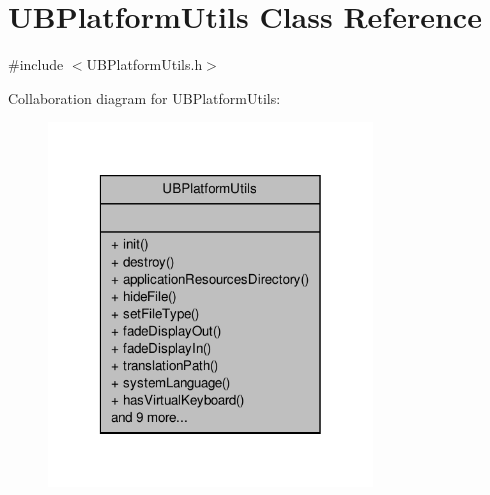 \hypertarget{class_u_b_platform_utils}{\section{U\-B\-Platform\-Utils Class Reference}
\label{d4/d99/class_u_b_platform_utils}
}


{\ttfamily \#include $<$U\-B\-Platform\-Utils.\-h$>$}



Collaboration diagram for U\-B\-Platform\-Utils\-:
\nopagebreak
\begin{figure}[H]
\begin{center}
\leavevmode
\includegraphics[width=244pt]{d2/dc4/class_u_b_platform_utils__coll__graph}
\end{center}
\end{figure}
